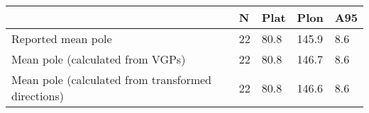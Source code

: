 \begin{tabular}{lllll}
\toprule
{} &   N &  Plat &   Plon &  A95 \\
\midrule
Reported mean pole                                 &  22 &  80.8 &  145.9 &  8.6 \\
Mean pole (calculated from VGPs)                   &  22 &  80.8 &  146.7 &  8.6 \\
Mean pole (calculated from transformed directions) &  22 &  80.8 &  146.6 &  8.6 \\
\bottomrule
\end{tabular}
